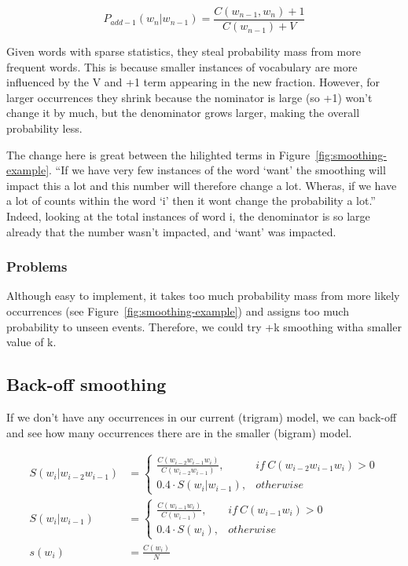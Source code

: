 \documentclass[11pt]{article}
\begin{document}
\begin{equation*}
    P_{add-1}(w_n|w_{n-1})=\frac{C(w_{n-1},w_n)+1}{C(w_{n-1})+V}
\end{equation*}

Given words with sparse statistics, they steal probability mass from more frequent words. This is because smaller instances of vocabulary are more influenced by the V and +1 term appearing in the new fraction. However, for larger occurrences they shrink because the nominator is large (so +1) won't change it by much, but the denominator grows larger, making the overall probability less.

The change here is great between the hilighted terms in Figure~\ref{fig:smoothing-example}. ``If we have very few instances of the word `want' the smoothing will impact this a lot and this number will therefore change a lot. Wheras, if we have a lot of counts within the word `i' then it wont change the probability a lot.'' Indeed, looking at the total instances of word i, the denominator is so large already that the number wasn't impacted, and `want' was impacted.

\subsubsection{Problems}

Although easy to implement, it takes too much probability mass from more likely occurrences (see Figure~\ref{fig:smoothing-example}) and assigns too much probability to unseen events. Therefore, we could try +k smoothing witha  smaller value of k.

\subsection{Back-off smoothing}

If we don't have any occurrences in our current (trigram) model, we can back-off and see how many occurrences there are in the smaller (bigram) model.

\begin{definition}
    \begin{align*}
        S(w_i|w_{i-2}w_{i-1}) &=
        \begin{cases}
            \frac{C(w_{i-2}w_{i-1}w_i)}{C(w_{i-2}w_{i-1})} , & if\ C(w_{i-2}w_{i-1}w_i) > 0 \\
            0.4 \cdot S(w_i|w_{i-1}) , & otherwise    
        \end{cases} \\
        S(w_i|w_{i-1}) &=
        \begin{cases}
            \frac{C(w_{i-1}w_i)}{C(w_{i-1})} , & if\ C(w_{i-1}w_i) > 0 \\
            0.4 \cdot S(w_i) , & otherwise    
        \end{cases} \\
        s(w_i) &= \frac{C(w_i)} N
    \end{align*}    
\end{definition}
\end{document}
